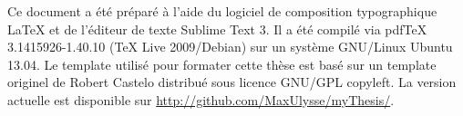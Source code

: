 \singlespacing

	\begin{center}
		\begin{tcolorbox}[colback=black!5!white,colframe=white!15!black,arc=0mm]
			\sffamily
			Ce document a été préparé à l'aide du logiciel de composition typographique {\LaTeX} et de l'éditeur de texte Sublime Text 3. Il a été compilé via pdfTeX 3.1415926-1.40.10 (TeX Live 2009/Debian) sur un système GNU/Linux Ubuntu 13.04. Le template utilisé pour formater cette thèse est basé sur un template originel de Robert Castelo distribué sous licence GNU/GPL copyleft. La version actuelle est disponible sur \url{http://github.com/MaxUlysse/myThesis/}.
		\end{tcolorbox}
	\end{center}
